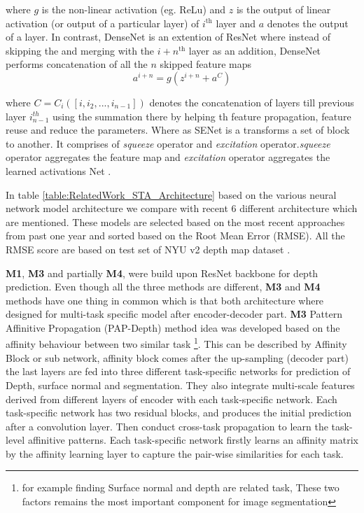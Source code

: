 where \(g\) is the non-linear activation (eg. ReLu) and \(z\) is the output of linear activation (or output of a particular layer) of $i^{\text{th}}$ layer and \(a\) denotes the output of a layer. In contrast, DenseNet is an extention of ResNet where instead of skipping the and merging with the $i+n^{\text{th}}$ layer as an addition, DenseNet performs concatenation of all the $n$ skipped feature maps
\begin{equation} \label{eqDenseNet}
    {a^{i+n}=g(z^{i+n} + a^{C})}
\end{equation}


where \({C =C_i([i,i_2,...,i_{n-1}])}\) denotes the concatenation of layers till previous layer \(i_{n-1}^{th}\)  using the summation \cite{huang2017densely} there by helping th feature propagation, feature reuse and  reduce the parameters. Where as SENet is a transforms a set of block to another. It comprises of \textit{squeeze} operator and \textit{excitation} operator.\textit{squeeze} operator aggregates the feature map and \textit{excitation} operator  aggregates the learned activations Net \cite{iandola2016squeezenet}. 


In table \ref{table:RelatedWork_STA_Architecture} based on the various neural network model architecture we compare with recent 6 different architecture which are mentioned. These models are selected based on the most recent approaches from past one year and sorted based on the Root Mean Error (RMSE). All the RMSE score are based on test set of NYU v2 depth map dataset \cite{silberman11indoor}.

\textbf{M1}, \textbf{M3} and partially \textbf{M4}, were build upon ResNet backbone for depth prediction. Even though all the three methods are different, \textbf{M3} and \textbf{M4} methods have one thing in common which is that both architecture where designed for multi-task specific model after encoder-decoder part. \textbf{M3} Pattern Affinitive Propagation (PAP-Depth) method idea was developed based on the affinity behaviour between two similar task \footnote{for example finding Surface normal and depth are related task, These two factors remains the  most important component for image segmentation}. This can be described by Affinity Block or sub network, affinity block comes after the up-sampling (decoder part) the last layers are fed into three different task-specific networks for prediction of Depth, surface normal and segmentation. They also integrate multi-scale features derived from different layers of encoder with each task-specific network. Each task-specific network has two residual blocks, and produces the initial prediction after a convolution layer. Then conduct cross-task propagation to learn the task-level affinitive patterns. Each task-specific network firstly learns an affinity matrix by the affinity learning layer to capture the pair-wise similarities for each task.

